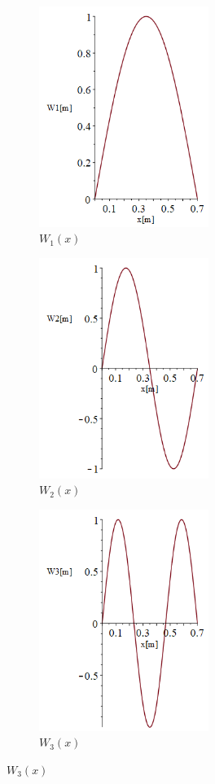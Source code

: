 \documentclass[11pt,a4paper]{article}
\begin{document}
\begin{enumerate}
	\begin{figure}[H]
		\begin{subfigure}[b]{0.3\textwidth}
			\includegraphics[width=55mm]{images/1_modeshape1.png}
			\caption{$W_1(x)$}
		\end{subfigure}
		\hfill
		\begin{subfigure}[b]{0.3\textwidth}
			\includegraphics[width=55mm]{images/1_modeshape2.png}
			\caption{$W_2(x)$}
		\end{subfigure}
		\hfill
		\begin{subfigure}[b]{0.3\textwidth}
			\includegraphics[width=55mm]{images/1_modeshape3.png}
			\caption{$W_3(x)$}
		\end{subfigure}
	\end{figure}


\end{enumerate}
\end{document}
